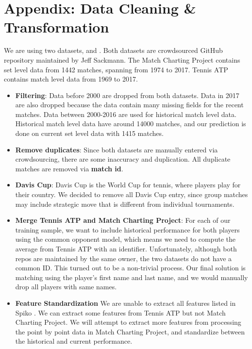 \documentclass[paper=a4, fontsize=11pt]{scrartcl} %
\numberwithin{equation}{section} %
\numberwithin{figure}{section} %
\numberwithin{table}{section} %
\begin{document}
\section{Appendix: Data Cleaning \& Transformation}
We are using two datasets, \cite{tennis_atp} and \cite{tennis_charting}.  Both datasets are crowdsourced GitHub repository maintained by Jeff Sackmann.  The Match Charting Project contains set level data from 1442 matches, spanning from 1974 to 2017.  Tennis ATP contains match level data from 1969 to 2017.
\begin{itemize}
\item \textbf{Filtering}: Data before 2000 are dropped from both datasets.  Data in 2017 are also dropped because the data contain many missing fields for the recent matches.  Data between 2000-2016 are used for historical match level data.  Historical match level data have around 14000 matches, and our prediction is done on current set level data with 1415 matches.
\item \textbf{Remove duplicates}: Since both datasets are manually entered via crowdsourcing, there are some inaccuracy and duplication.  All duplicate matches are removed via \textbf{match id}.
\item \textbf{Davis Cup}: Davis Cup is the World Cup for tennis, where players play for their country.  We decided to remove all Davis Cup entry, since group matches may include strategic move that is different from individual tournaments.
\item \textbf{Merge Tennis ATP and Match Charting Project}: For each of our training sample, we want to include historical performance for both players using the common opponent model, which means we need to compute the average from Tennis ATP with an identifier.  Unfortunately, although both repos are maintained by the same owner, the two datasets do not have a common ID.  This turned out to be a non-trivial process.  Our final solution is matching using the player's first name and last name, and we would manually drop all players with same names.
\item \textbf{Feature Standardization} We are unable to extract all features listed in Spiko \cite{tennis1}.  We can extract some features from Tennis ATP but not Match Charting Project.  We will attempt to extract more features from processing the point by point data in Match Charting Project, and standardize between the historical and current performance.
\end{itemize}
\end{document}
